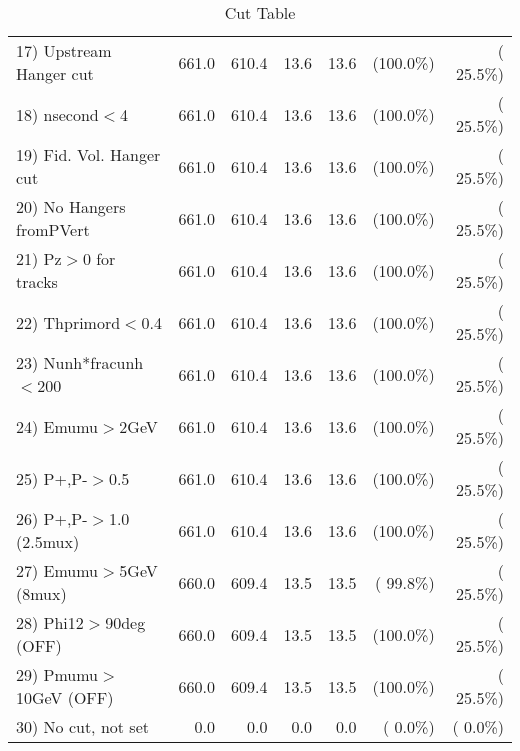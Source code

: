 \begin{table}[h!]
\begin{tabular}{||l||r|r|r|r|r|r||}
 17) Upstream Hanger cut  &        661.0 &        610.4 &         13.6 &         13.6 & (100.0\%) & ( 25.5\%) \\
 18) nsecond$<$4          &        661.0 &        610.4 &         13.6 &         13.6 & (100.0\%) & ( 25.5\%) \\
 19) Fid. Vol. Hanger cut &        661.0 &        610.4 &         13.6 &         13.6 & (100.0\%) & ( 25.5\%) \\
 20) No Hangers fromPVert &        661.0 &        610.4 &         13.6 &         13.6 & (100.0\%) & ( 25.5\%) \\
 21) Pz$>$0 for tracks    &        661.0 &        610.4 &         13.6 &         13.6 & (100.0\%) & ( 25.5\%) \\
 22) Thprimord$<$0.4      &        661.0 &        610.4 &         13.6 &         13.6 & (100.0\%) & ( 25.5\%) \\
 23) Nunh*fracunh$<$200   &        661.0 &        610.4 &         13.6 &         13.6 & (100.0\%) & ( 25.5\%) \\
 24) Emumu$>$2GeV         &        661.0 &        610.4 &         13.6 &         13.6 & (100.0\%) & ( 25.5\%) \\
 25) P+,P-$>$0.5          &        661.0 &        610.4 &         13.6 &         13.6 & (100.0\%) & ( 25.5\%) \\
 26) P+,P-$>$1.0 (2.5mux) &        661.0 &        610.4 &         13.6 &         13.6 & (100.0\%) & ( 25.5\%) \\
 27) Emumu$>$5GeV  (8mux) &        660.0 &        609.4 &         13.5 &         13.5 & ( 99.8\%) & ( 25.5\%) \\
 28) Phi12$>$90deg  (OFF) &        660.0 &        609.4 &         13.5 &         13.5 & (100.0\%) & ( 25.5\%) \\
 29) Pmumu$>$10GeV  (OFF) &        660.0 &        609.4 &         13.5 &         13.5 & (100.0\%) & ( 25.5\%) \\
 30) No cut, not set      &          0.0 &          0.0 &          0.0 &          0.0 & (  0.0\%) & (  0.0\%) \\
 \hline
 \hline
 \end{tabular}
 \caption{Cut Table           }
 \label{tab-cutheavy_neutrino_4.000}
 \end{table}
